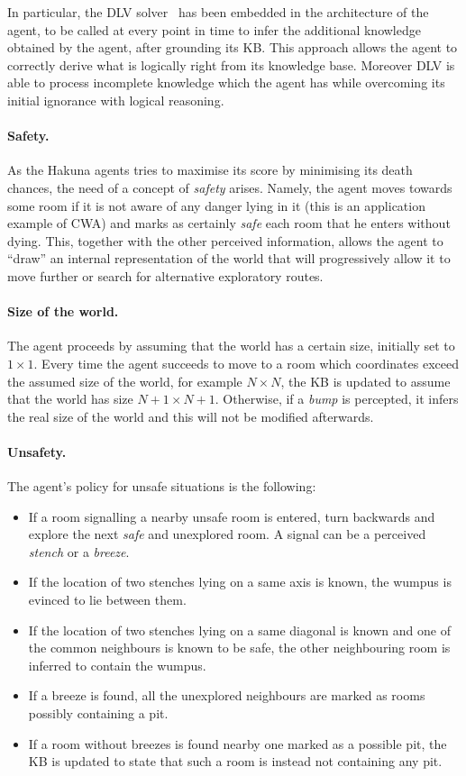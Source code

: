 \documentclass{llncs}
\begin{document}
In particular, the DLV solver~\cite{DLV-system} has been embedded in the architecture of the agent, to be called at every point in time to infer the additional knowledge obtained by the agent, after grounding its KB.
This approach allows the agent to correctly derive what is logically right from its knowledge base. Moreover DLV is able to process incomplete knowledge which the agent has while overcoming its initial ignorance with logical reasoning.

\paragraph{Safety.} As the Hakuna agents tries to maximise its score by minimising its death chances, the need of a concept of \emph{safety} arises.
Namely, the agent moves towards some room if it is not aware of any danger lying in it (this is an application example of CWA) and marks as certainly \emph{safe} each room that he enters without dying.
This, together with the other perceived information, allows the agent to ``draw'' an internal representation of the world that will progressively allow it to move further or search for alternative exploratory routes.

\paragraph{Size of the world.} The agent proceeds by assuming that the world has a certain size, initially set to $1 \times 1$.
Every time the agent succeeds to move to a room which coordinates exceed the assumed size of the world, for example $N \times N$, the KB is updated to assume that the world has size $N+1 \times N+1$.
Otherwise, if a \emph{bump} is percepted, it infers the real size of the world and this will not be modified afterwards.

\paragraph{Unsafety.} The agent's policy for unsafe situations is the following:
\begin{itemize}
	\item If a room signalling a nearby unsafe room is entered, turn backwards and explore the next \emph{safe} and unexplored room. A signal can be a perceived \emph{stench} or a \emph{breeze}.
	\item If the location of two stenches lying on a same axis is known, the wumpus is evinced to lie between them.
	\item If the location of two stenches lying on a same diagonal is known and one of the common neighbours is known to be safe, the other neighbouring room is inferred to contain the wumpus.
	\item If a breeze is found, all the unexplored neighbours are marked as rooms possibly containing a pit.
	\item If a room without breezes is found nearby one marked as a possible pit, the KB is updated to state that such a room is instead not containing any pit. 
\end{itemize}
\end{document}
